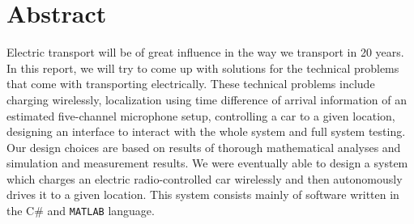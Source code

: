\documentclass[11pt,titlepage]{report}
\begin{document}
\section*{Abstract}
Electric transport will be of great influence in the way we transport in 20 years. In this report, we will try to come up with solutions for the technical problems that come with transporting electrically. These technical problems include charging wirelessly, localization using time difference of arrival information of an estimated five-channel microphone setup, controlling a car to a given location, designing an interface to interact with the whole system and full system testing. Our design choices are based on results of thorough mathematical analyses and simulation and measurement results. We were eventually able to design a system which charges an electric radio-controlled car wirelessly and then autonomously drives it to a given location. This system consists mainly of software written in the C\# and \texttt{MATLAB} language.
\end{document}
